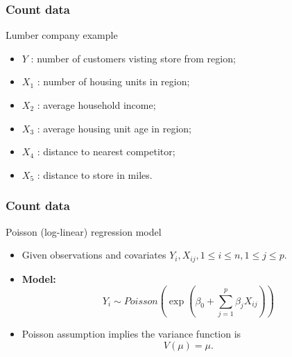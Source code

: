 \documentclass[handout]{beamer}
\begin{document}

   \begin{frame} \frametitle{Count data}

   \begin{block}
       {Lumber company example}
       \begin{itemize}
       \item $Y$ : number of customers visting store from region;

    \item $X_1$ : number of housing units in region;

    \item $X_2$ : average household income;

    \item $X_3$ : average housing unit age in region;

    \item $X_4$ : distance to nearest competitor;

    \item $X_5$ : distance to store in miles.

       \end{itemize}
   \end{block}
   \end{frame}


   \begin{frame} \frametitle{Count data}

   \begin{block}
       {Poisson (log-linear) regression model}

       \begin{itemize}
       \item      Given observations and covariates
        $Y_i , X_{ij} , 1 \leq i  \leq n, 1 \leq j  \leq p$.


      \item {\bf Model:}
   $$     Y_{i} \sim Poisson \left(\exp\left(\beta_0 + \sum_{j=1}^p \beta_j X_{ij} \right)\right)$$


   \item Poisson assumption implies the  variance
        function is
   $$ V (\mu) = \mu.$$
       \end{itemize}

   \end{block}
   \end{frame}
\end{document}

